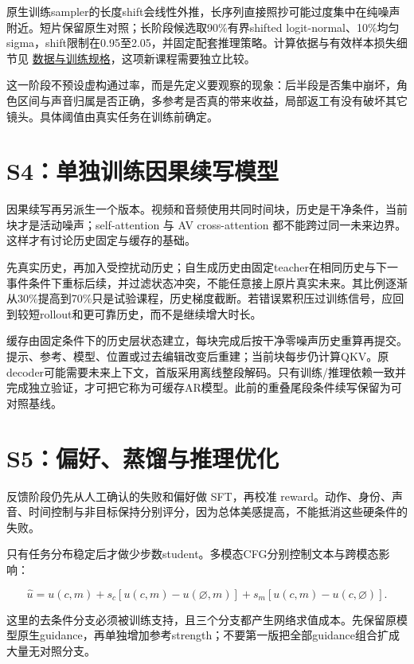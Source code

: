 原生训练sampler的长度shift会线性外推，长序列直接照抄可能过度集中在纯噪声附近。短片保留原生对照；长阶段候选取90\%有界shifted logit-normal、10\%均匀sigma，shift限制在0.95至2.05，并固定配套推理策略。计算依据与有效样本损失细节见 \hyperref[seedance-m25]{数据与训练规格}，这项新课程需要独立比较。

这一阶段不预设虚构通过率，而是先定义要观察的现象：后半段是否集中崩坏，角色区间与声音归属是否正确，多参考是否真的带来收益，局部返工有没有破坏其它镜头。具体阈值由真实任务在训练前确定。

\section{S4：单独训练因果续写模型}\label{seedance-m20-s4ux5355ux72ecux8badux7ec3ux56e0ux679cux7eedux5199ux6a21ux578b}

因果续写再另派生一个版本。视频和音频使用共同时间块，历史是干净条件，当前块才是活动噪声；self-attention 与 AV cross-attention 都不能跨过同一未来边界。这样才有讨论历史固定与缓存的基础。

先真实历史，再加入受控扰动历史；自生成历史由固定teacher在相同历史与下一事件条件下重标后续，并过滤状态冲突，不能任意接上原片真实未来。其比例逐渐从30\%提高到70\%只是试验课程，历史梯度截断。若错误累积压过训练信号，应回到较短rollout和更可靠历史，而不是继续增大时长。

缓存由固定条件下的历史层状态建立，每块完成后按干净零噪声历史重算再提交。提示、参考、模型、位置或过去编辑改变后重建；当前块每步仍计算QKV。原decoder可能需要未来上下文，首版采用离线整段解码。只有训练/推理依赖一致并完成独立验证，才可把它称为可缓存AR模型。此前的重叠尾段条件续写保留为可对照基线。

\section{S5：偏好、蒸馏与推理优化}\label{seedance-m20-s5ux504fux597dux84b8ux998fux4e0eux63a8ux7406ux4f18ux5316}

反馈阶段仍先从人工确认的失败和偏好做 SFT，再校准 reward。动作、身份、声音、时间控制与非目标保持分别评分，因为总体美感提高，不能抵消这些硬条件的失败。

只有任务分布稳定后才做少步数student。多模态CFG分别控制文本与跨模态影响：

\[
\hat u=u(c,m)+s_c[u(c,m)-u(\varnothing,m)]
+s_m[u(c,m)-u(c,\varnothing)].
\]

这里的去条件分支必须被训练支持，且三个分支都产生网络求值成本。先保留原模型原生guidance，再单独增加参考strength；不要第一版把全部guidance组合扩成大量无对照分支。

